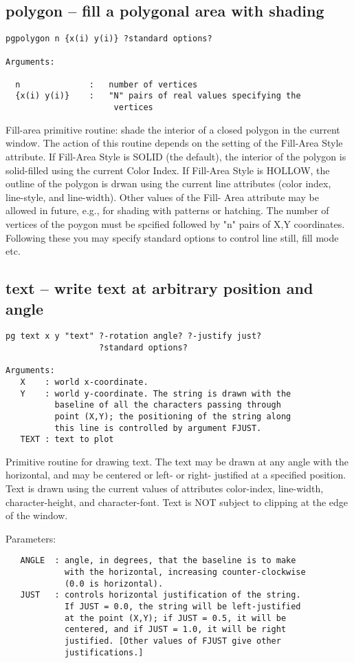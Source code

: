 \subsection{polygon -- fill a polygonal area with shading}
\begin{verbatim}
pgpolygon n {x(i) y(i)} ?standard options?

Arguments:

  n              :   number of vertices
  {x(i) y(i)}    :   "N" pairs of real values specifying the
                      vertices
\end{verbatim}
Fill-area primitive routine: shade the interior of a closed
polygon in the current window.  The action of this routine depends
on the setting of the Fill-Area Style attribute. If Fill-Area Style
is SOLID (the default), the interior of the polygon is solid-filled
using the current Color Index. If Fill-Area Style is HOLLOW, the
outline of the polygon is drwan using the current line attributes
(color index, line-style, and line-width). Other values of the Fill-
Area attribute may be allowed in future, e.g., for shading with
patterns or hatching. The number of vertices of the poygon must be
spcified followed by "n" pairs of X,Y coordinates.  Following these
you may specify standard options to control line still, fill mode
etc.




\subsection{text  -- write text at arbitrary position and angle}
\begin{verbatim}
pg text x y "text" ?-rotation angle? ?-justify just?
                   ?standard options?

Arguments:
   X    : world x-coordinate.
   Y    : world y-coordinate. The string is drawn with the
          baseline of all the characters passing through
          point (X,Y); the positioning of the string along
          this line is controlled by argument FJUST.
   TEXT : text to plot
\end{verbatim}
Primitive routine for drawing text. The text may be drawn at any
angle with the horizontal, and may be centered or left- or right-
justified at a specified position.   Text is drawn using the current
values of attributes color-index, line-width, character-height, and
character-font.  Text is NOT subject to clipping at the edge of the
window.


Parameters:
\begin{verbatim}
   ANGLE  : angle, in degrees, that the baseline is to make
            with the horizontal, increasing counter-clockwise
            (0.0 is horizontal).
   JUST   : controls horizontal justification of the string.
            If JUST = 0.0, the string will be left-justified
            at the point (X,Y); if JUST = 0.5, it will be
            centered, and if JUST = 1.0, it will be right
            justified. [Other values of FJUST give other
            justifications.]
\end{verbatim}


